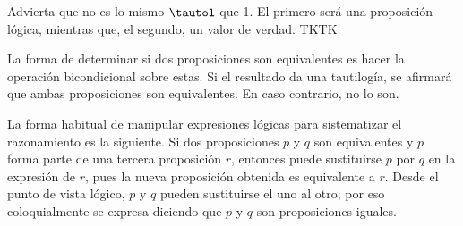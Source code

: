 Advierta que no es lo mismo $\tautol$ que 1. El primero será una proposición
lógica, mientras que, el segundo, un valor de verdad. TKTK


La forma de determinar si dos proposiciones son equivalentes es hacer la
operación bicondicional sobre estas. Si el resultado da una tautilogía, se
afirmará que ambas proposiciones son equivalentes. En caso contrario, no lo
son.

La forma habitual de manipular expresiones lógicas para sistematizar el
razonamiento es la siguiente. Si dos proposiciones $p$ y $q$ son
equivalentes y $p$ forma parte de una tercera proposición $r$, entonces
puede sustituirse $p$ por $q$ en la expresión de $r$, pues la nueva
proposición obtenida es equivalente a $r$. Desde el punto de vista lógico,
$p$ y $q$ pueden sustituirse el uno al otro; por eso coloquialmente se
expresa diciendo que $p$ y $q$ son proposiciones iguales.




